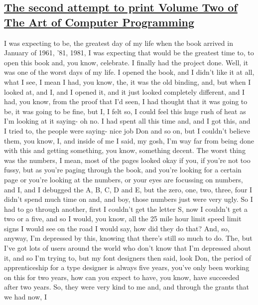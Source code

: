 \documentclass[]{article}
\begin{document}
\subsection{\texorpdfstring{\href{http://webofstories.com/play/17124}{The
second attempt to print Volume Two of The Art of Computer
Programming}}{The second attempt to print Volume Two of The Art of Computer Programming}}\label{the-second-attempt-to-print-volume-two-of-the-art-of-computer-programming}

I was expecting to be, the greatest day of my life when the book arrived
in January of 1961, '81, 1981, I was expecting that would be the
greatest time to, to open this book and, you know, celebrate. I finally
had the project done. Well, it was one of the worst days of my life. I
opened the book, and I didn't like it at all, what I see, I mean I had,
you know, the, it was the old binding, and, but when I looked at, and I,
and I opened it, and it just looked completely different, and I had, you
know, from the proof that I'd seen, I had thought that it was going to
be, it was going to be fine, but I, I felt so, I could feel this huge
rush of heat as I'm looking at it saying- oh no. I had spent all this
time and, and I got this, and I tried to, the people were saying- nice
job Don and so on, but I couldn't believe them, you know, I, and inside
of me I said, my gosh, I'm way far from being done with this and getting
something, you know, something decent. The worst thing was the numbers,
I mean, most of the pages looked okay if you, if you're not too fussy,
but as you're paging through the book, and you're looking for a certain
page or you're looking at the numbers, or your eyes are focussing on
numbers, and I, and I debugged the A, B, C, D and E, but the zero, one,
two, three, four I didn't spend much time on and, and boy, those numbers
just were very ugly. So I had to go through another, first I couldn't
get the letter S, now I couldn't get a two or a five, and so I would,
you know, all the 25 mile hour limit speed limit signs I would see on
the road I would say, how did they do that? And, so, anyway, I'm
depressed by this, knowing that there's still so much to do. The, but
I've got lots of users around the world who don't know that I'm
depressed about it, and so I'm trying to, but my font designers then
said, look Don, the period of apprenticeship for a type designer is
always five years, you've only been working on this for two years, how
can you expect to have, you know, have succeeded after two years. So,
they were very kind to me and, and through the grants that we had now, I
\end{document}
